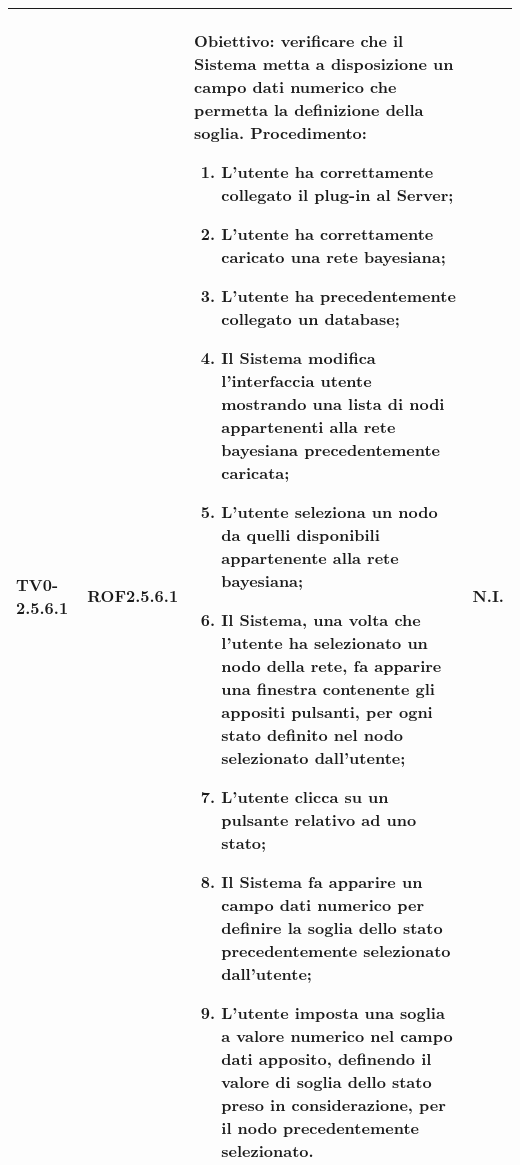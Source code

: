 \begin{longtable}{|C{.15\textwidth}|C{.13\textwidth}|m{.52\textwidth}|C{.08\textwidth}|}
TV0-2.5.6.1 & ROF2.5.6.1 &
	\textbf{Obiettivo}: verificare che il Sistema metta a disposizione un campo dati numerico che permetta la definizione della soglia. \newline
	\textbf{Procedimento}:
	\begin{enumerate}
		\item L'utente ha correttamente collegato il plug-in al Server;
		\item L'utente ha correttamente caricato una rete bayesiana;
		\item L'utente ha precedentemente collegato un database;
		\item Il Sistema modifica l'interfaccia utente mostrando una lista di nodi appartenenti alla rete bayesiana precedentemente caricata;
		\item L'utente seleziona un nodo da quelli disponibili appartenente alla rete bayesiana;
		\item Il Sistema, una volta che l'utente ha selezionato un nodo della rete, fa apparire una finestra contenente gli appositi pulsanti, per ogni stato definito nel nodo selezionato dall'utente;
		\item L'utente clicca su un pulsante relativo ad uno stato;
		\item Il Sistema fa apparire un campo dati numerico per definire la soglia dello stato precedentemente selezionato dall'utente;
		\item L'utente imposta una soglia a valore numerico nel campo dati apposito, definendo il valore di soglia dello stato preso in considerazione, per il nodo precedentemente selezionato.
	\end{enumerate}
	& N.I. \\
\hline


\end{longtable}
